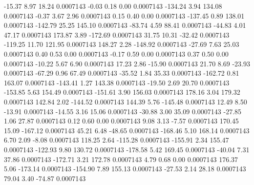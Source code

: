       -15.37        8.97       18.24     0.0007143
       -0.03        0.18        0.00     0.0007143
     -134.24        3.94      134.08     0.0007143
       -0.37        3.67        2.96     0.0007143
        0.15        0.40        0.00     0.0007143
     -137.45        0.89      138.01     0.0007143
     -142.79       25.25      145.10     0.0007143
      -83.74        4.59       88.41     0.0007143
      -44.83        4.01       47.17     0.0007143
      173.87        3.89     -172.69     0.0007143
       31.75       10.31      -32.42     0.0007143
     -119.25       11.70      121.95     0.0007143
      148.27        2.28     -148.92     0.0007143
      -27.69        7.63       25.03     0.0007143
        0.40        0.53        0.00     0.0007143
       -0.17        0.59        0.00     0.0007143
        0.37        0.50        0.00     0.0007143
      -10.22        5.67        6.90     0.0007143
       17.23        2.86      -15.90     0.0007143
       21.70        8.69      -23.93     0.0007143
      -67.29        0.96       67.49     0.0007143
      -35.52        1.84       35.33     0.0007143
     -162.72        0.81      163.07     0.0007143
     -143.41        1.27      143.38     0.0007143
      -19.50        2.69       20.70     0.0007143
     -153.85        5.63      154.49     0.0007143
     -151.61        3.90      156.03     0.0007143
      178.16        3.04      179.32     0.0007143
      142.84        2.02     -144.52     0.0007143
      144.39        5.76     -145.48     0.0007143
       12.49        8.50      -13.91     0.0007143
      -14.55        3.16       15.06     0.0007143
      -30.88        3.00       35.09     0.0007143
      -27.85        1.06       27.87     0.0007143
        0.12        0.60        0.00     0.0007143
        9.08        3.13       -7.57     0.0007143
      170.45       15.09     -167.12     0.0007143
       45.21        6.48      -48.65     0.0007143
     -168.46        5.10      168.14     0.0007143
        6.70        2.09       -8.08     0.0007143
      118.25        2.64     -115.28     0.0007143
     -155.91        2.34      155.47     0.0007143
     -122.93        9.80      130.72     0.0007143
     -178.58        5.42      169.45     0.0007143
      -40.04        7.31       37.86     0.0007143
     -172.71        3.21      172.78     0.0007143
        4.79        0.68        0.00     0.0007143
      176.37        5.06     -173.14     0.0007143
     -154.90        7.89      155.13     0.0007143
      -27.53        2.14       28.18     0.0007143
       79.04        3.40      -74.87     0.0007143
